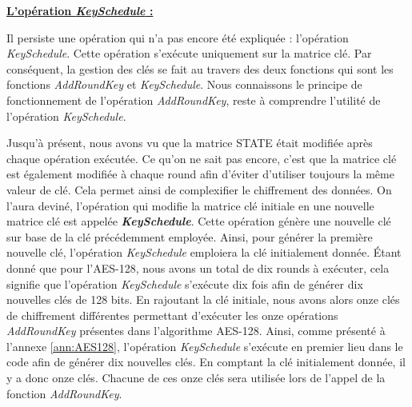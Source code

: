 \documentclass[oneside]{book}
\begin{document}
\newpage
\underline{\textbf{L'opération \textit{KeySchedule} :}}

\vspace{0.1cm}Il persiste une opération qui n'a pas encore été expliquée : l'opération \textit{KeySchedule}. Cette opération s'exécute uniquement sur la matrice clé. Par conséquent, la gestion des clés se fait au travers des deux fonctions qui sont les fonctions \textit{AddRoundKey} et \textit{KeySchedule}. Nous connaissons le principe de fonctionnement de l'opération \textit{AddRoundKey}, reste à comprendre l'utilité de l'opération \textit{KeySchedule}.

\hspace{-0.5cm}Jusqu'à présent, nous avons vu que la matrice STATE était modifiée après chaque opération exécutée. Ce qu'on ne sait pas encore, c'est que la matrice clé est également modifiée à chaque round afin d'éviter d'utiliser toujours la même valeur de clé. Cela permet ainsi de complexifier le chiffrement des données. On l'aura deviné, l'opération qui modifie la matrice clé initiale en une nouvelle matrice clé est appelée \textbf{\textit{KeySchedule}}. Cette opération génère une nouvelle clé sur base de la clé précédemment employée. Ainsi, pour générer la première nouvelle clé, l'opération \textit{KeySchedule} emploiera la clé initialement donnée. Étant donné que pour l'AES-128, nous avons un total de dix rounds à exécuter, cela signifie que l'opération \textit{KeySchedule} s'exécute dix fois afin de générer dix nouvelles clés de 128 bits. En rajoutant la clé initiale, nous avons alors onze clés de chiffrement différentes permettant d'exécuter les onze opérations \textit{AddRoundKey} présentes dans l'algorithme AES-128. Ainsi, comme présenté à l'annexe \ref{ann:AES128}, l'opération \textit{KeySchedule} s'exécute en premier lieu dans le code afin de générer dix nouvelles clés. En comptant la clé initialement donnée, il y a donc onze clés. Chacune de ces onze clés sera utilisée lors de l'appel de la fonction \textit{AddRoundKey}. 
\end{document}
